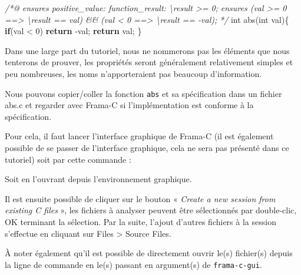 \documentclass[12pt,francais,]{scrbook}
\newenvironment{Shaded}{}{}
\newcommand{\KeywordTok}[1]{\textcolor[rgb]{0.00,0.44,0.13}{\textbf{{#1}}}}
\newcommand{\DataTypeTok}[1]{\textcolor[rgb]{0.56,0.13,0.00}{{#1}}}
\newcommand{\DecValTok}[1]{\textcolor[rgb]{0.25,0.63,0.44}{{#1}}}
\newcommand{\CommentTok}[1]{\textcolor[rgb]{0.38,0.63,0.69}{\textit{{#1}}}}
\newcommand{\NormalTok}[1]{{#1}}
\begin{document}
\begin{footnotesize}\begin{Shaded}
\begin{Highlighting}[]
\CommentTok{/*@}
\CommentTok{  ensures positive_value: function_result: \textbackslash{}result >= 0;}
\CommentTok{  ensures (val >= 0 ==> \textbackslash{}result == val) && }
\CommentTok{          (val < 0 ==> \textbackslash{}result == -val);}
\CommentTok{*/}
\DataTypeTok{int} \NormalTok{abs(}\DataTypeTok{int} \NormalTok{val)\{}
  \KeywordTok{if}\NormalTok{(val < }\DecValTok{0}\NormalTok{) }\KeywordTok{return} \NormalTok{-val;}
  \KeywordTok{return} \NormalTok{val;}
\NormalTok{\}}
\end{Highlighting}
\end{Shaded}\end{footnotesize}

Dans une large part du tutoriel, nous ne nommerons pas les éléments que
nous tenterons de prouver, les propriétés seront généralement
relativement simples et peu nombreuses, les noms n'apporteraient pas
beaucoup d'information.

Nous pouvons copier/coller la fonction \texttt{abs} et sa spécification
dans un fichier abs.c et regarder avec Frama-C si l'implémentation est
conforme à la spécification.

Pour cela, il faut lancer l'interface graphique de Frama-C (il est
également possible de se passer de l'interface graphique, cela ne sera
pas présenté dans ce tutoriel) soit par cette commande :

\begin{footnotesize}\begin{Shaded}
\end{Shaded}\end{footnotesize}

Soit en l'ouvrant depuis l'environnement graphique.

Il est ensuite possible de cliquer sur le bouton « \emph{Create a new
session from existing C files} », les fichiers à analyser peuvent être
sélectionnés par double-clic, OK terminant la sélection. Par la suite,
l'ajout d'autres fichiers à la session s'effectue en cliquant sur Files
\textgreater{} Source Files.

À noter également qu'il est possible de directement ouvrir le(s)
fichier(s) depuis la ligne de commande en le(s) passant en argument(s)
de \texttt{frama-c-gui}.
\end{document}
